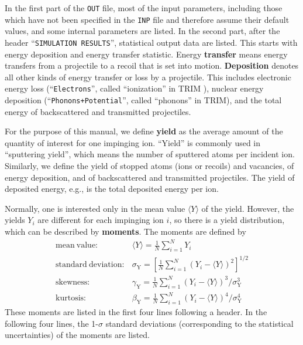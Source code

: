 In the first part of the \texttt{OUT} file, most of the input parameters,
including those which have not been specified in the \texttt{INP} file and
therefore assume their default values, and some internal parameters are listed.
In the second part, after the header ``\texttt{SIMULATION RESULTS}'',
statistical output data are listed. This starts with energy deposition and
energy transfer statistic. Energy \textbf{transfer} means energy transfers from
a projectile to a recoil that is set into motion. \textbf{Deposition} denotes
all other kinds of energy transfer or loss by a projectile. This includes
electronic energy loss (``\texttt{Electrons}'', called ``ionization'' in TRIM
\cite{SRIM}), nuclear energy deposition (``\texttt{Phonons+Potential}'', called
``phonons'' in TRIM), and the total energy of backscattered and transmitted
projectiles.

For the purpose of this manual, we define \textbf{yield} as the average amount
of the quantity of interest for one impinging ion. ``Yield'' is commonly used in
``sputtering yield'', which means the number of sputtered atoms per incident
ion. Similarly, we define the yield of stopped atoms (ions or recoils) and
vacancies, of energy deposition, and of backscattered and transmitted
projectiles. The yield of deposited energy, e.g., is the total deposited energy
per ion.

Normally, one is interested only in the mean value $\langle Y \rangle$ of the
yield. However, the yields $Y_i$ are different for each impinging ion $i$, so
there is a yield distribution, which can be described by \textbf{moments}. The
moments are defined by
%
\begin{eqnarray}
    \mathrm{mean\ value}: & 
        \langle Y \rangle = \frac{1}{N} \sum_{i=1}^N Y_i \label{eq:mom1} \\
    \mathrm{standard\ deviation}: & 
        \sigma_\mathrm{Y} = \left[ \frac{1}{N} \sum_{i=1}^N (Y_i-\langle Y \rangle)^2  
        \right] ^ {1/2} \label{eq:mom2} \\
    \mathrm{skewness}: &
        \gamma_\mathrm{Y} = \frac{1}{N} \sum_{i=1}^N (Y_i-\langle Y \rangle)^3 / 
        \sigma_\mathrm{Y}^3 \label{eq:mom3} \\
    \mathrm{kurtosis}: &
        \beta_\mathrm{Y} = \frac{1}{N} \sum_{i=1}^N (Y_i-\langle Y \rangle)^4 / 
        \sigma_\mathrm{Y}^4 \label{eq:mom4}
\end{eqnarray}
%
These moments are listed in the first four lines following a header. In the
following four lines, the 1-$\sigma$ standard deviations (corresponding to the
statistical uncertainties) of the moments are listed.

